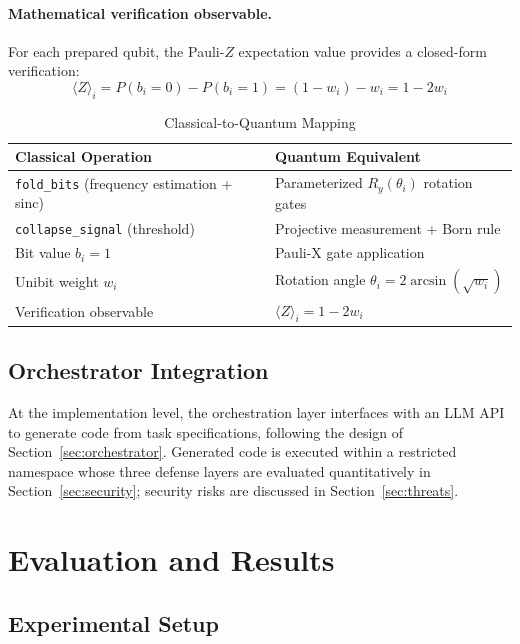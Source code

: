 ﻿\documentclass[12pt,a4paper]{article}
\begin{document}
\paragraph{Mathematical verification observable.} For each prepared qubit, the Pauli-$Z$ expectation value provides a closed-form verification:
\begin{equation}
    \langle Z \rangle_i = P(b_i = 0) - P(b_i = 1) = (1 - w_i) - w_i = 1 - 2w_i
\end{equation}

\begin{table}[H]
\centering
\caption{Classical-to-Quantum Mapping}
\label{tab:mapping}
\small
\begin{tabular}{@{}ll@{}}
\toprule
\textbf{Classical Operation} & \textbf{Quantum Equivalent} \\
\midrule
\texttt{fold\_bits} (frequency estimation + sinc) & Parameterized $R_y(\theta_i)$ rotation gates \\
\texttt{collapse\_signal} (threshold) & Projective measurement + Born rule \\
Bit value $b_i = 1$ & Pauli-X gate application \\
Unibit weight $w_i$ & Rotation angle $\theta_i = 2\arcsin(\sqrt{w_i})$ \\
Verification observable & $\langle Z \rangle_i = 1 - 2w_i$ \\
\bottomrule
\end{tabular}
\end{table}

\subsection{Orchestrator Integration}

At the implementation level, the orchestration layer interfaces with an LLM API to generate code from task specifications, following the design of Section~\ref{sec:orchestrator}. Generated code is executed within a restricted namespace whose three defense layers are evaluated quantitatively in Section~\ref{sec:security}; security risks are discussed in Section~\ref{sec:threats}.


\section{Evaluation and Results}\label{sec:evaluation}

\subsection{Experimental Setup}
\end{document}
